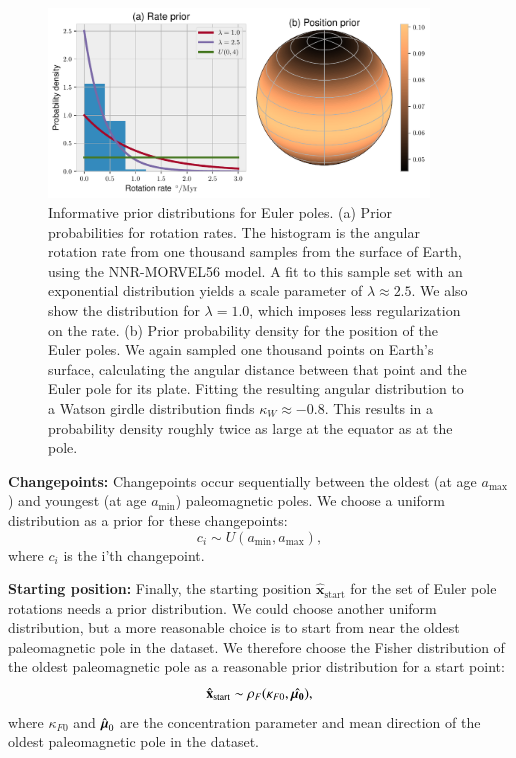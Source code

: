 \documentclass[preprint,12pt,authoryear]{elsarticle}
\newcommand{\mitbf}[1]{\hbox{\mathversion{bold}$#1$}}
\begin{document}
\begin{figure}
\includegraphics[width=0.9\textwidth]{figures/euler_pole_prior/euler_pole_prior.pdf}
\caption[Informative prior distributions for Euler poles]{Informative prior distributions for Euler poles. (a) Prior probabilities for rotation rates. The histogram is the angular rotation rate from one thousand samples from the surface of Earth, using the NNR-MORVEL56 model. A fit to this sample set with an exponential distribution yields a scale parameter of $\lambda \approx 2.5$. We also show the distribution for $\lambda = 1.0$, which imposes less regularization on the rate. (b) Prior probability density for the position of the Euler poles. We again sampled one thousand points on Earth's surface, calculating the angular distance between that point and the Euler pole for its plate. Fitting the resulting angular distribution to a Watson girdle distribution finds $\kappa_W \approx -0.8$. This results in a probability density roughly twice as large at the equator as at the pole.}
\label{fig:euler_pole_prior}
\end{figure}

\textbf{Changepoints:} 
Changepoints occur sequentially between the oldest (at age $a_\mathrm{max}$) and
youngest (at age $a_\mathrm{min}$) paleomagnetic poles.
We choose a uniform distribution as a prior for these changepoints:
\begin{equation}
c_i \sim U( a_\mathrm{min}, a_\mathrm{max}),
\end{equation}
where $c_i$ is the i'th changepoint.

\textbf{Starting position:}
Finally, the starting position $\hat{\mathbf{x}}_\mathrm{start}$ for the set of Euler pole rotations needs a prior distribution.
We could choose another uniform distribution, but a more reasonable choice
is to start from near the oldest paleomagnetic pole in the dataset.
We therefore choose the Fisher distribution of the oldest paleomagnetic pole as a reasonable prior distribution for a start point:
\begin{equation}
\hat{\mathbf{x}}_\mathrm{start} \sim \rho_F(\kappa_{F0}, \hat{\mitbf{\mu_0}}),
\end{equation}
where $\kappa_{F0}$ and $\hat{\mitbf{\mu}}_0$ are the concentration parameter and mean direction
of the oldest paleomagnetic pole in the dataset.
\end{document}

